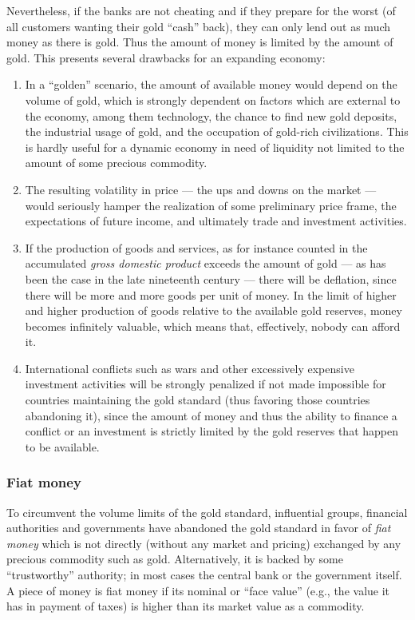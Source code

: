 \documentclass[aps,rmp,preprint,amsfonts,showpacs,showkeys]{revtex4}
\begin{document}
Nevertheless, if the banks are not cheating and if they prepare for the worst (of all customers wanting their gold ``cash'' back),
they can only lend out as much money as there is gold.
Thus the amount of money is limited by the amount of gold.
This presents several drawbacks for an expanding economy:
\begin{enumerate}
\item
In a ``golden'' scenario,
the amount of available money would depend on the volume of gold, which is strongly dependent on factors which are external to the economy,
among them technology, the chance to find new gold deposits, the industrial usage of gold, and the occupation of gold-rich civilizations.
This is hardly useful for a dynamic economy in need of liquidity not limited to the amount of some precious commodity.


\item
The resulting volatility in price --- the ups and downs on the market ---
would seriously hamper the realization of some preliminary price frame, the expectations of future income, and ultimately trade and investment activities.


\item
If the production of goods and services, as for instance counted in the
accumulated {\em gross domestic product}
exceeds the amount of gold --- as has been the case in the
late nineteenth century --- there will be deflation, since there will be more and more goods per unit of money.
In the limit of higher and higher production of goods relative to the available gold reserves, money becomes infinitely valuable,
which means that, effectively, nobody can afford it.

\item
International conflicts such as wars and other excessively expensive investment activities will be strongly penalized if not made impossible
for countries maintaining the gold standard (thus favoring those countries abandoning it),
since the amount of money and thus the ability to finance a conflict or an investment is strictly limited
by the gold reserves that happen to be available.
\end{enumerate}

\subsubsection{Fiat money}

To circumvent the volume limits of the gold standard,
influential groups, financial authorities and governments have abandoned the gold standard
in favor of {\em fiat money} which is
not directly (without any market and pricing) exchanged by any precious commodity such as gold.
Alternatively, it is
backed by some ``trustworthy'' authority; in most cases the central bank or the government itself.
A piece of money is fiat money if its nominal or ``face value''  (e.g., the value it has in payment of taxes)
is higher than its market value as a commodity.
\end{document}
